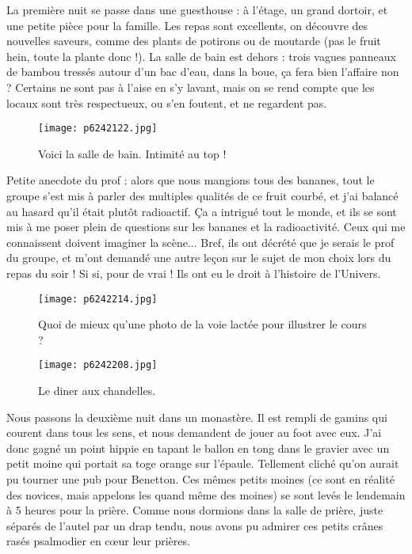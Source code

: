 \documentclass{book}
\begin{document}
La première nuit se passe dans une guesthouse : à l'étage, un grand dortoir, et une petite pièce pour la famille. Les repas sont excellents, on découvre des nouvelles saveurs, comme des plants de potirons ou de moutarde (pas le fruit hein, toute la plante donc !). La salle de bain est dehors : trois vagues panneaux de bambou tressés autour d'un bac d'eau, dans la boue, ça fera bien l'affaire non ? Certains ne sont pas à l'aise en s'y lavant, mais on se rend compte que les locaux sont très respectueux, ou s'en foutent, et ne regardent pas.




\begin{figure}[h]
\centering
\texttt{[image: p6242122.jpg]}
\caption*{Voici la salle de bain. Intimité au top !}
\end{figure}

Petite anecdote du prof : alors que nous mangions tous des bananes, tout le groupe s'est mis à parler des multiples qualités de ce fruit courbé, et j'ai balancé au hasard qu'il était plutôt radioactif. Ça a intrigué tout le monde, et ils se sont mis à me poser plein de questions sur les bananes et la radioactivité. Ceux qui me connaissent doivent imaginer la scène... Bref, ils ont décrété que je serais le prof du groupe, et m'ont demandé une autre leçon sur le sujet de mon choix lors du repas du soir ! Si si, pour de vrai ! Ils ont eu le droit à l'histoire de l'Univers.




\begin{figure}[h]
\centering
\texttt{[image: p6242214.jpg]}
\caption*{Quoi de mieux qu'une photo de la voie lactée pour illustrer le cours ?}
\end{figure}


\begin{figure}[h]
\centering
\texttt{[image: p6242208.jpg]}
\caption*{Le diner aux chandelles.}
\end{figure}

Nous passons la deuxième nuit dans un monastère. Il est rempli de gamins qui courent dans tous les sens, et nous demandent de jouer au foot avec eux. J'ai donc gagné un point hippie en tapant le ballon en tong dans le gravier avec un petit moine qui portait sa toge orange sur l'épaule. Tellement cliché qu'on aurait pu tourner une pub pour Benetton. Ces mêmes petits moines (ce sont en réalité des novices, mais appelons les quand même des moines) se sont levés le lendemain à 5 heures pour la prière. Comme nous dormions dans la salle de prière, juste séparés de l'autel par un drap tendu, nous avons pu admirer ces petits crânes rasés psalmodier en cœur leur prières.
\end{document}
